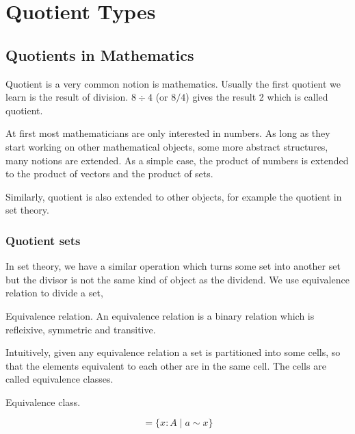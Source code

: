 \chapter{Quotient Types}
\label{QuotientTypes} %



\section{Quotients in Mathematics}

Quotient is a very common notion is mathematics. Usually the first
quotient we learn is the result of division. $8 \div 4$ (or $8 / 4$)
gives the result 2 which is called quotient.

At first most mathematicians are only interested in numbers. As long
as they start working on other mathematical objects, some more
abstract structures, many notions are extended. As a simple case, the
product of numbers is extended to the product of vectors and the
product of sets. 

Similarly, quotient is also extended to other objects, for example the
quotient in set theory.

\subsection{Quotient sets}
In set theory, we have a similar operation which turns some set
into another set but the divisor is not the same kind of object as the
dividend. We use equivalence relation to divide a set,

\begin{definition}

Equivalence relation. An equivalence relation is a binary
relation which is refleixive, symmetric and transitive.

\end{definition}

Intuitively, given any equivalence relation a set is partitioned into
some cells, so that the elements equivalent to each other are in the
same cell. The cells are called equivalence classes.

\begin{definition}

Equivalence class.

\begin{equation}
[ a ] = \{x : A \;| \; a \sim x \}
\end{equation}

\end{definition}

